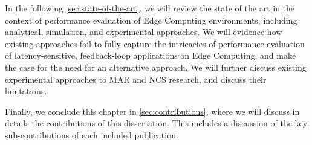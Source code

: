 \bigskip

In the following  \cref{sec:state-of-the-art}, we will review the state of the art in the context of performance evaluation of Edge Computing environments, including analytical, simulation, and experimental approaches.
We will evidence how existing approaches fail to fully capture the intricacies of performance evaluation of latency-sensitive, feedback-loop applications on Edge Computing, and make the case for the need for an alternative approach.
We will further discuss existing experimental approaches to \gls{MAR} and \gls{NCS} research, and discuss their limitations.

Finally, we conclude this chapter in \cref{sec:contributions}, where we will discuss in details the contributions of this dissertation.
This includes a discussion of the key sub-contributions of each included publication.